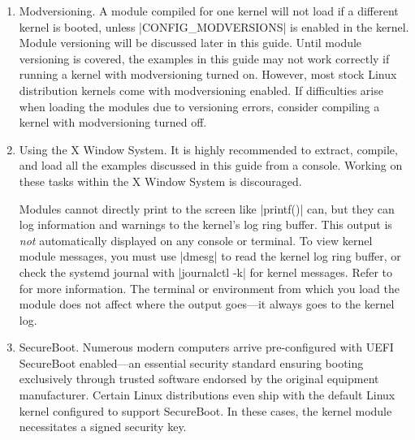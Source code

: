 \documentclass[10pt, oneside]{book}
\begin{document}
\begin{enumerate}
  \item Modversioning.
        A module compiled for one kernel will not load if a different kernel is booted,
        unless \cpp|CONFIG_MODVERSIONS| is enabled in the kernel.
        Module versioning will be discussed later in this guide.
        Until module versioning is covered, the examples in this guide may not work correctly if running a kernel with modversioning turned on.
        However, most stock Linux distribution kernels come with modversioning enabled.
        If difficulties arise when loading the modules due to versioning errors, consider compiling a kernel with modversioning turned off.

  \item Using the X Window System.
        It is highly recommended to extract, compile, and load all the examples discussed in this guide from a console.
        Working on these tasks within the X Window System is discouraged.

        Modules cannot directly print to the screen like \cpp|printf()| can,
        but they can log information and warnings to the kernel's log ring buffer.
        This output is \emph{not} automatically displayed on any console or terminal.
        To view kernel module messages, you must use \sh|dmesg| to read the kernel log ring buffer,
        or check the systemd journal with \sh|journalctl -k| for kernel messages.
        Refer to  for more information.
        The terminal or environment from which you load the module does not affect where the output goes—it always goes to the kernel log.
  \item SecureBoot.
        Numerous modern computers arrive pre-configured with UEFI SecureBoot enabled—an essential security standard ensuring booting exclusively through trusted software endorsed by the original equipment manufacturer.
        Certain Linux distributions even ship with the default Linux kernel configured to support SecureBoot.
        In these cases, the kernel module necessitates a signed security key.


\end{enumerate}
\end{document}
